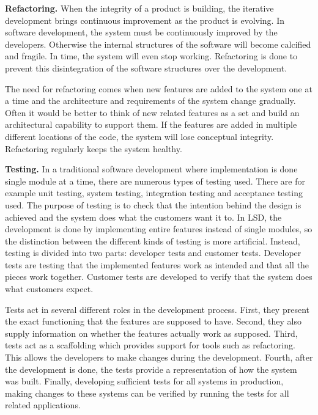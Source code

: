 \textbf{Refactoring.} When the integrity of a product is building, the iterative development brings continuous improvement as the product is evolving. In software development, the system must be continuously improved by the developers. Otherwise the internal structures of the software will become calcified and fragile. In time, the system will even stop working. Refactoring is done to prevent this disintegration of the software structures over the development.~\cite{poppendieck2003LSD}

The need for refactoring comes when new features are added to the system one at a time and the architecture and requirements of the system change gradually. Often it would be better to think of new related features as a set and build an architectural capability to support them. If the features are added in multiple different locations of the code, the system will lose conceptual integrity. Refactoring regularly keeps the system healthy.~\cite{poppendieck2003LSD}


\textbf{Testing.} In a traditional software development where implementation is done single module at a time, there are numerous types of testing used. There are for example unit testing, system testing, integration testing and acceptance testing used. The purpose of testing is to check that the intention behind the design is achieved and the system does what the customers want it to. In LSD, the development is done by implementing entire features instead of single modules, so the distinction between the different kinds of testing is more artificial. Instead, testing is divided into two parts: developer tests and customer tests. Developer tests are testing that the implemented features work as intended and that all the pieces work together. Customer tests are developed to verify that the system does what customers expect.~\cite{poppendieck2003LSD}

Tests act in several different roles in the development process. First, they present the exact functioning that the features are supposed to have. Second, they also supply information on whether the features actually work as supposed. Third, tests act as a scaffolding which provides support for tools such as refactoring. This allows the developers to make changes during the development. Fourth, after the development is done, the tests provide a representation of how the system was built. Finally, developing sufficient tests for all systems in production, making changes to these systems can be verified by running the tests for all related applications.~\cite{poppendieck2003LSD}

